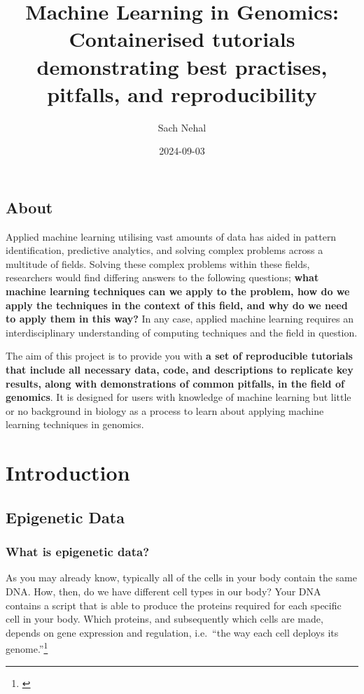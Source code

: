\documentclass[
]{book}
\title{Machine Learning in Genomics: Containerised tutorials demonstrating best practises, pitfalls, and reproducibility}
\author{Sach Nehal}
\date{2024-09-03}
\begin{document}
\maketitle

{
\setcounter{tocdepth}{1}
\tableofcontents
}
\chapter*{About}\label{about}

Applied machine learning utilising vast amounts of data has aided in pattern identification, predictive analytics, and solving complex problems across a multitude of fields. Solving these complex problems within these fields, researchers would find differing answers to the following questions; \textbf{what machine learning techniques can we apply to the problem, how do we apply the techniques in the context of this field, and why do we need to apply them in this way?} In any case, applied machine learning requires an interdisciplinary understanding of computing techniques and the field in question.

The aim of this project is to provide you with \textbf{a set of reproducible tutorials that include all necessary data, code, and descriptions to replicate key results, along with demonstrations of common pitfalls, in the field of genomics}. It is designed for users with knowledge of machine learning but little or no background in biology as a process to learn about applying machine learning techniques in genomics.

\part{Introduction}\label{part-introduction}

\chapter{Epigenetic Data}\label{epigenetic-data}

\section{What is epigenetic data?}\label{what-is-epigenetic-data}

As you may already know, typically all of the cells in your body contain the same DNA. How, then, do we have different cell types in our body? Your DNA contains a script that is able to produce the proteins required for each specific cell in your body. Which proteins, and subsequently which cells are made, depends on gene expression and regulation, i.e.~``the way each cell deploys its genome.''\footnote{\citet{ralston2008}}
\end{document}

